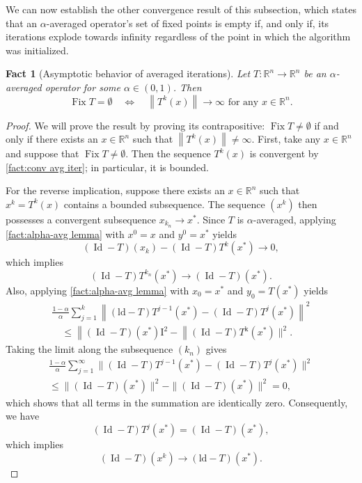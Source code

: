 \documentclass[smallextended,numbook,nospthms]{svjour3}
\theoremstyle{plain}
\newtheorem{fact}[theorem]{Fact}
\theoremstyle{definition}
\def\RR{\mathds R}
\DeclareMathOperator{\Id}{Id}
\DeclareMathOperator{\Fix}{Fix}
\begin{document}
We can now establish the other convergence result of this subsection, which states that an $\alpha$-averaged operator's set of fixed points is empty if, and only if, its iterations explode towards infinity regardless of the point in which the algorithm was initialized.
\begin{fact}[Asymptotic behavior of averaged iterations]\label{fact:asymp behav avg iter} Let $T: \RR^n \rightarrow \RR^n$ be an $\alpha$-averaged operator for some $\alpha \in (0,1)$. Then
\[
\operatorname{Fix} T=\emptyset \quad \Leftrightarrow \quad\left\|T^{k}(x)\right\| \rightarrow \infty \text { for any } x \in \RR^n.
\]
\end{fact}
\begin{proof}
	
We will prove the result by proving its contrapositive: $\Fix T \neq \emptyset$ if and only if there exists an $x \in \RR^n$ such that $\left\|T^{k}(x)\right\| \neq \infty$.
First, take any $x \in \RR^n$ and suppose that $\Fix T \neq \emptyset$. Then the sequence $T^{k}(x)$ is convergent by \cref{fact:conv avg iter}; in particular, it is bounded.

For the reverse implication, suppose there exists an $x \in \RR^n$ such that $x^{k}=T^{k}(x)$ contains a bounded subsequence. The sequence $\left(x^{k}\right)$ then possesses a convergent subsequence $x_{k_{n}} \rightarrow x^{*}$. Since $T$ is $\alpha$-averaged, applying \cref{fact:alpha-avg lemma} with $x^{0}=x$ and $y^{0}=x^{*}$ yields
\[
(\Id-T)\left(x_{k}\right)-(\Id-T) T^{k}\left(x^{*}\right) \rightarrow 0,
\]
which implies
\[
(\Id-T) T^{k_{n}}\left(x^{*}\right) \rightarrow(\Id-T)\left(x^{*}\right).
\]
Also, applying \cref{fact:alpha-avg lemma} with $x_{0}=x^{*}$ and $y_{0}=T\left(x^{*}\right)$ yields
\begin{align}
	\frac{1-\alpha}{\alpha} \sum_{j=1}^{k}\left\|(\mathrm{ld}-T) T^{j-1}\left(x^{*}\right)-(\Id-T) T^{j}\left(x^{*}\right)\right\|^{2} \\
	\quad \leq\left\|(\Id-T)\left(x^{*}\right) \mathrm{I}^{2}-\right\|(\Id-T) T^{\mathrm{k}}\left(x^{*}\right) \|^{2}.
\end{align}
Taking the limit along the subsequence $\left(k_{n}\right)$ gives
\begin{align}
\frac{1-\alpha}{\alpha} \sum_{j=1}^{\infty} \|(\Id-T) T^{j-1}(x^{*})-(\Id-T) T^{j}(x^{*})\|^{2} \\
\leq \|(\Id-T)(x^{*})\|^{2}-\|(\Id-T)(x^{*})\|^{2}=0,
\end{align}
which shows that all terms in the summation are identically zero. Consequently, we have
\[
(\Id-T) T^{j}\left(x^{*}\right)=(\Id-T)\left(x^{*}\right),
\]
which implies
\[
(\Id-T)\left(x^{k}\right) \rightarrow(\mathrm{ld}-T)\left(x^{*}\right).
\]


\end{proof}
\end{document}
